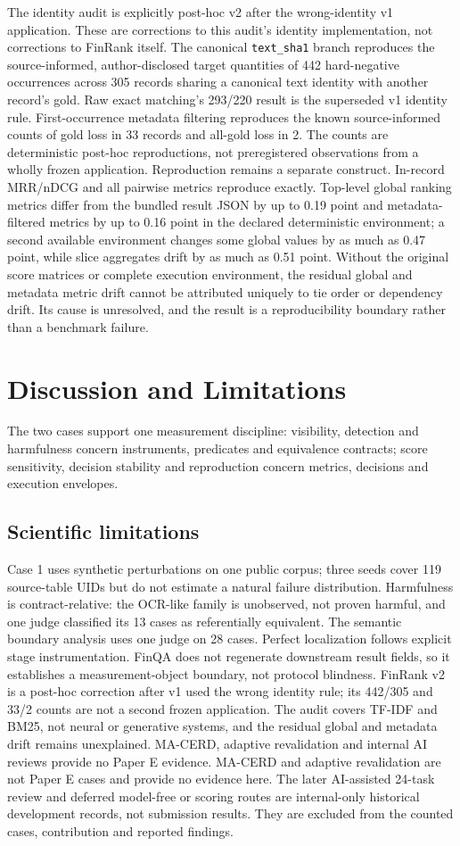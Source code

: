 \documentclass[10pt]{article}
\begin{document}
The identity audit is explicitly post-hoc v2 after the wrong-identity v1 application. These are corrections to this audit's identity implementation, not corrections to FinRank itself. The canonical \texttt{text\_sha1} branch reproduces the source-informed, author-disclosed target quantities of 442 hard-negative occurrences across 305 records sharing a canonical text identity with another record's gold. Raw exact matching's 293/220 result is the superseded v1 identity rule. First-occurrence metadata filtering reproduces the known source-informed counts of gold loss in 33 records and all-gold loss in 2. The counts are deterministic post-hoc reproductions, not preregistered observations from a wholly frozen application.
Reproduction remains a separate construct. In-record MRR/nDCG and all pairwise metrics reproduce exactly. Top-level global ranking metrics differ from the bundled result JSON by up to 0.19 point and metadata-filtered metrics by up to 0.16 point in the declared deterministic environment; a second available environment changes some global values by as much as 0.47 point, while slice aggregates drift by as much as 0.51 point. Without the original score matrices or complete execution environment, the residual global and metadata metric drift cannot be attributed uniquely to tie order or dependency drift. Its cause is unresolved, and the result is a reproducibility boundary rather than a benchmark failure.
\section{Discussion and Limitations}
The two cases support one measurement discipline: visibility, detection and harmfulness concern instruments, predicates and equivalence contracts; score sensitivity, decision stability and reproduction concern metrics, decisions and execution envelopes.
\subsection{Scientific limitations}
Case 1 uses synthetic perturbations on one public corpus; three seeds cover 119 source-table UIDs but do not estimate a natural failure distribution. Harmfulness is contract-relative: the OCR-like family is unobserved, not proven harmful, and one judge classified its 13 cases as referentially equivalent. The semantic boundary analysis uses one judge on 28 cases. Perfect localization follows explicit stage instrumentation. FinQA does not regenerate downstream result fields, so it establishes a measurement-object boundary, not protocol blindness.
FinRank v2 is a post-hoc correction after v1 used the wrong identity rule; its 442/305 and 33/2 counts are not a second frozen application. The audit covers TF-IDF and BM25, not neural or generative systems, and the residual global and metadata drift remains unexplained. MA-CERD, adaptive revalidation and internal AI reviews provide no Paper E evidence.
MA-CERD and adaptive revalidation are not Paper E cases and provide no evidence here. The later AI-assisted 24-task review and deferred model-free or scoring routes are internal-only historical development records, not submission results. They are excluded from the counted cases, contribution and reported findings.
\end{document}
